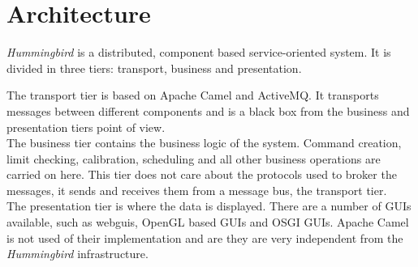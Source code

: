 \section{Architecture}

\emph{Hummingbird} is a distributed, component based service-oriented system. It is divided in three tiers: transport, business and presentation.

The transport tier is based on Apache Camel and ActiveMQ. It transports messages between different components  and is a black box from the business and presentation tiers point of view.\\

The business tier contains the business logic of the system. Command creation, limit checking, calibration, scheduling and all other business operations are carried on here. This tier does not care about the protocols used to broker the messages, it sends and receives them from a message bus, the transport tier.\\

The presentation tier is where the data is displayed. There are a number of GUIs available, such as webguis, OpenGL based GUIs and OSGI GUIs. Apache Camel is not used of their implementation and are they are very independent from the \emph{Hummingbird} infrastructure.

 

\newpage